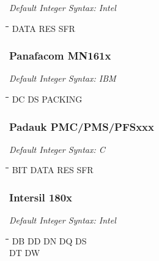 {\em Default Integer Syntax: Intel}

{\tt\begin{tabbing} 
\hspace{3cm}\=\hspace{3cm}\=\hspace{3cm}\=\hspace{3cm}\=\kill
DATA       \> RES         \> SFR \\
\end{tabbing}}

\subsubsection{Panafacom MN161x}

{\em Default Integer Syntax: IBM}

{\tt\begin{tabbing}
\hspace{3cm}\=\hspace{3cm}\=\hspace{3cm}\=\hspace{3cm}\=\kill
DC         \> DS          \> PACKING \\
\end{tabbing}}

\subsubsection{Padauk PMC/PMS/PFSxxx}

{\em Default Integer Syntax: C}

{\tt\begin{tabbing}
\hspace{3cm}\=\hspace{3cm}\=\hspace{3cm}\=\hspace{3cm}\=\kill
BIT        \> DATA       \> RES       \> SFR \\
\end{tabbing}}

\subsubsection{Intersil 180x}

{\em Default Integer Syntax: Intel}

{\tt\begin{tabbing}
\hspace{3cm}\=\hspace{3cm}\=\hspace{3cm}\=\hspace{3cm}\=\kill
DB         \> DD          \> DN          \> DQ          \> DS \\
DT         \> DW \\
\end{tabbing}}


